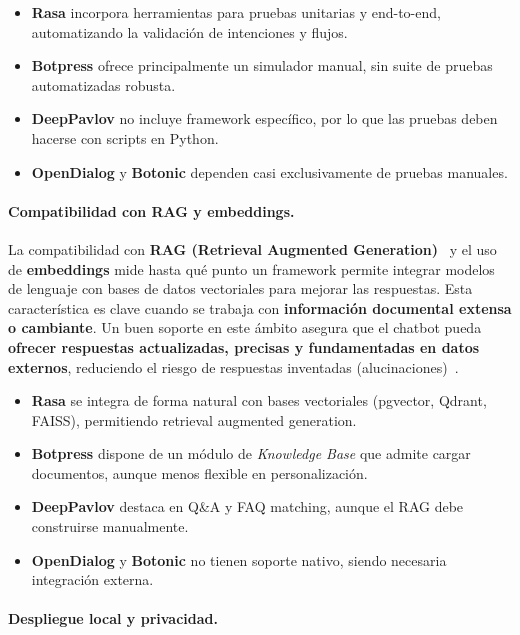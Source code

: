 \begin{itemize}
    \item \textbf{Rasa} incorpora herramientas para pruebas unitarias y end-to-end, automatizando la validación de intenciones y flujos.
    \item \textbf{Botpress} ofrece principalmente un simulador manual, sin suite de pruebas automatizadas robusta.
    \item \textbf{DeepPavlov} no incluye framework específico, por lo que las pruebas deben hacerse con scripts en Python.
    \item \textbf{OpenDialog} y \textbf{Botonic} dependen casi exclusivamente de pruebas manuales.
\end{itemize}

\paragraph{Compatibilidad con RAG y embeddings.}

La compatibilidad con \textbf{RAG (Retrieval Augmented Generation)}~\cite{lewis2020retrieval} y el uso de \textbf{embeddings} mide hasta qué punto un framework permite integrar modelos de lenguaje con bases de datos vectoriales para mejorar las respuestas. Esta característica es clave cuando se trabaja con \textbf{información documental extensa o cambiante}. Un buen soporte en este ámbito asegura que el chatbot pueda \textbf{ofrecer respuestas actualizadas, precisas y fundamentadas en datos externos}, reduciendo el riesgo de respuestas inventadas (alucinaciones)~\cite{ji2023survey}.

\begin{itemize}
    \item \textbf{Rasa} se integra de forma natural con bases vectoriales (pgvector, Qdrant, FAISS), permitiendo retrieval augmented generation.
    \item \textbf{Botpress} dispone de un módulo de \textit{Knowledge Base} que admite cargar documentos, aunque menos flexible en personalización.
    \item \textbf{DeepPavlov} destaca en Q\&A y FAQ matching, aunque el RAG debe construirse manualmente.
    \item \textbf{OpenDialog} y \textbf{Botonic} no tienen soporte nativo, siendo necesaria integración externa.
\end{itemize}

\paragraph{Despliegue local y privacidad.}

